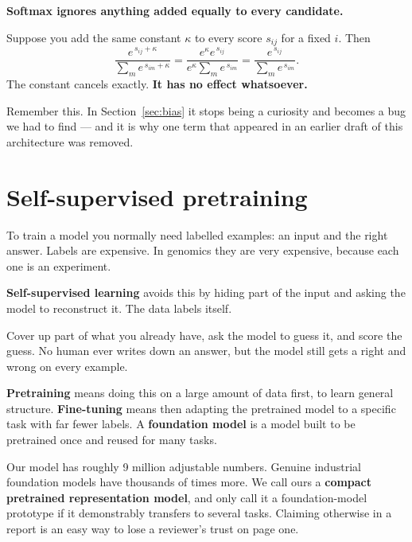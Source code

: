 \documentclass[11pt,a4paper]{article}
\newcommand{\term}[1]{\textcolor{deepblue}{\textbf{#1}}}
\begin{document}
\begin{carefulbox}
\label{box:shift}
\textbf{Softmax ignores anything added equally to every candidate.}

Suppose you add the same constant $\kappa$ to every score $s_{ij}$ for a fixed
$i$. Then
\[
\frac{e^{\,s_{ij}+\kappa}}{\sum_m e^{\,s_{im}+\kappa}}
= \frac{e^{\kappa} e^{\,s_{ij}}}{e^{\kappa}\sum_m e^{\,s_{im}}}
= \frac{e^{\,s_{ij}}}{\sum_m e^{\,s_{im}}}.
\]
The constant cancels exactly. \textbf{It has no effect whatsoever.}

Remember this. In Section~\ref{sec:bias} it stops being a curiosity and becomes a
bug we had to find --- and it is why one term that appeared in an earlier draft of
this architecture was removed.
\end{carefulbox}

\section{Self-supervised pretraining}

To train a model you normally need labelled examples: an input and the right
answer. Labels are expensive. In genomics they are very expensive, because each
one is an experiment.

\term{Self-supervised learning} avoids this by hiding part of the input and asking
the model to reconstruct it. The data labels itself.

\begin{plainbox}
Cover up part of what you already have, ask the model to guess it, and score the
guess. No human ever writes down an answer, but the model still gets a right and
wrong on every example.
\end{plainbox}

\term{Pretraining} means doing this on a large amount of data first, to learn general
structure. \term{Fine-tuning} means then adapting the pretrained model to a specific
task with far fewer labels. A \term{foundation model} is a model built to be
pretrained once and reused for many tasks.

\begin{carefulbox}
Our model has roughly 9 million adjustable numbers. Genuine industrial
foundation models have thousands of times more. We call ours a \textbf{compact
pretrained representation model}, and only call it a foundation-model prototype
if it demonstrably transfers to several tasks. Claiming otherwise in a report is
an easy way to lose a reviewer's trust on page one.
\end{carefulbox}
\end{document}
